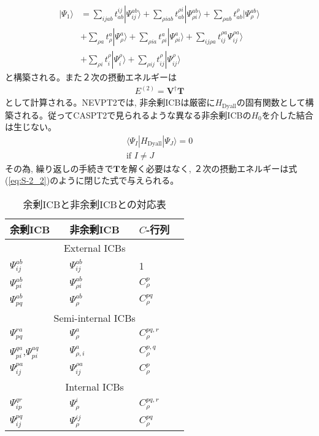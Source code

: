 \documentclass[11pt,pra,aps]{revtex4}
\begin{document}
\begin{align}
  |\Psi_1\rangle&=\sum_{ijab} t_{ab}^{ij} |\Psi_{ij}^{ab}\rangle+\sum_{\rho iab} t_{ab}^{\rho i} |\Psi_{\rho i}^{ab}\rangle+\sum_{\rho ab} t_{ab}^{\rho} |\Psi_{\rho}^{ab}\rangle \nonumber \\
  &+\sum_{\rho a} t_{\rho}^a |\Psi_{\rho}^{a}\rangle +\sum_{\rho ia} t_{\rho i}^a |\Psi_{\rho i}^{a}\rangle + \sum_{ij\rho a} t_{ij}^{\rho a} \Psi_{ij}^{\rho a}\rangle \nonumber \\
  &+\sum_{\rho i} t_i^{\rho} |\Psi_i^{\rho}\rangle+\sum_{\rho ij} t_{ij}^{\rho} |\Psi_{ij}^{\rho}\rangle
\end{align}
と構築される。また２次の摂動エネルギーは
\begin{align}
  E^{(2)}=\mathbf{V}^\dagger\mathbf{T}
\end{align}
として計算される。NEVPT2では, 非余剰ICBは厳密に$H_\text{Dyall}$の固有関数として構築される。従ってCASPT2で見られるような異なる非余剰ICBの$H_0$を介した結合は生じない。
\begin{align}
  \langle\Psi_I|H_\text{Dyall}|\Psi_J\rangle=0 \\ \text{if }I\neq J
\end{align}
その為, 繰り返しの手続きで$\mathbf{T}$を解く必要はなく, ２次の摂動エネルギーは式(\ref{eq:S-2_2})のように閉じた式で与えられる。

\begin{table}[h]
\caption{\label{tab:ICBs}
余剰ICBと非余剰ICBとの対応表
}
\begin{ruledtabular}
\begin{tabular}{llllll}
  余剰ICB          && 非余剰ICB        && $C$-行列 \\
  \hline
  \multicolumn{6}{c}{External ICBs} \\
  $\Psi_{ij}^{ab}$ && $\Psi_{ij}^{ab}$ && 1 \\
  $\Psi_{pi}^{ab}$ && $\Psi_{\rho i}^{ab}$ && $C_\rho^p$ \\
  $\Psi_{pq}^{ab}$ && $\Psi_{\rho}^{ab}$ && $C_\rho^{pq}$ \\
  \multicolumn{6}{c}{Semi-internal ICBs} \\
  $\Psi_{pq}^{ra}$ && $\Psi_{\rho}^{a}$ && $C_\rho^{pq,r}$ \\
  $\Psi_{pi}^{qa}$,$\Psi_{pi}^{aq}$ && $\Psi_{\rho,i}^{a}$ && $C_\rho^{p,q}$ \\
  $\Psi_{ij}^{pa}$ && $\Psi_{ij}^{\rho a}$ && $C_\rho^{p}$ \\  
  \multicolumn{6}{c}{Internal ICBs} \\
  $\Psi_{ip}^{qr}$ && $\Psi_{\rho}^{i}$ && $C_\rho^{pq,r}$ \\
  $\Psi_{ij}^{pq}$ && $\Psi_{\rho}^{ij}$ && $C_\rho^{pq}$ \\    
\end{tabular}
\end{ruledtabular}
\end{table}


\end{document}
